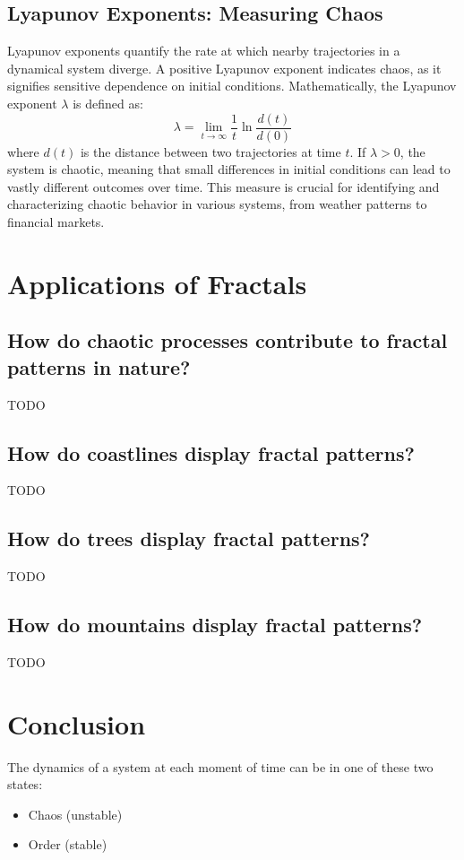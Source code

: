 \documentclass[12pt]{article}
\begin{document}
\subsection{Lyapunov Exponents: Measuring Chaos}
Lyapunov exponents quantify the rate at which nearby trajectories in a dynamical system diverge. A positive Lyapunov exponent indicates chaos, as it signifies sensitive dependence on initial conditions. Mathematically, the Lyapunov exponent \( \lambda \) is defined as:
\[
\lambda = \lim_{t \to \infty} \frac{1}{t} \ln \frac{d(t)}{d(0)}
\]
where \( d(t) \) is the distance between two trajectories at time \( t \). If \( \lambda > 0 \), the system is chaotic, meaning that small differences in initial conditions can lead to vastly different outcomes over time. This measure is crucial for identifying and characterizing chaotic behavior in various systems, from weather patterns to financial markets.

\section{Applications of Fractals}


\subsection{How do chaotic processes contribute to fractal patterns in nature?}
TODO

\subsection{How do coastlines display fractal patterns?}
TODO

\subsection{How do trees display fractal patterns?}
TODO

\subsection{How do mountains display fractal patterns?}
TODO

\section{Conclusion}

The dynamics of a system at each moment of time can be in one of these two states:
\begin{itemize}
    \item Chaos (unstable)
    \item Order (stable)
\end{itemize}
\end{document}
